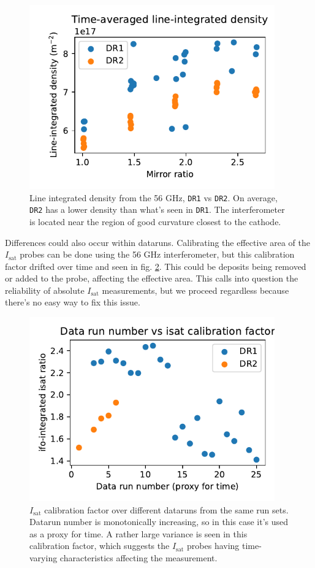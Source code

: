 \begin{figure}
    \centering
    \includegraphics[width=300pt]{figures/extra/M_vs_nbar.pdf}
    \caption[Line integrated density, \texttt{DR1} vs \texttt{DR2}]{Line integrated density from the 56 GHz, \texttt{DR1} vs \texttt{DR2}. On average, \texttt{DR2} has a lower density than what's seen in \texttt{DR1}. The interferometer is located near the region of good curvature closest to the cathode.}
    \label{fig_extra:M_vs_nbar}
\end{figure}

Differences could also occur within dataruns. Calibrating the effective area of the $I_\text{sat}$ probes can be done using the 56 GHz interferometer, but this calibration factor drifted over time and seen in fig. \ref{fig_extra:isat_calibration_factor}. This could be deposits being removed or added to the probe, affecting the effective area. This calls into question the reliability of absolute $I_\text{sat}$ measurements, but we proceed regardless because there's no easy way to fix this issue. 

\begin{figure}
    \centering
    \includegraphics[width=300pt]{figures/extra/run-num_vs_nbar-isat-ratio.pdf}
    \caption[$I_\text{sat}$ calibration factor over runs]{$I_\text{sat}$ calibration factor over different dataruns from the same run sets. Datarun number is monotonically increasing, so in this case it's used as a proxy for time. A rather large variance is seen in this calibration factor, which suggests the $I_\text{sat}$ probes having time-varying characteristics affecting the measurement.}
    \label{fig_extra:isat_calibration_factor}
\end{figure}



